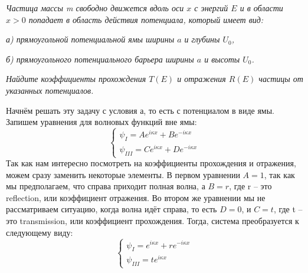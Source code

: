 \begin{center}
    \textit{Частица массы m свободно движется вдоль оси $x$ с энергий $E$ и в области $x>0$ попадает в область действия потенциала, который имеет вид:}
    
    \textit{а) прямоугольной потенциальной ямы ширины $a$ и глубины $U_0$,}

    \textit{б) прямоугольного потенциального барьера ширины $a$ и высоты $U_0$.}
    
    \textit{Найдите коэффициенты прохождения $T(E)$ и отражения $R(E)$ частицы от указанных потенциалов.}
\end{center}

Начнём решать эту задачу с условия а, то есть с потенциалом в виде ямы. Запишем уравнения для волновых функций вне ямы:
\[
\begin{cases}
\psi_I = Ae^{i\kappa x} + Be^{-i\kappa x} \\
\psi_{III} = Ce^{i\kappa x} + De^{-i\kappa x}
\end{cases}
\]
Так как нам интересно посмотреть на коэффициенты прохождения и отражения, можем сразу заменить некоторые элементы. В первом уравнении $A = 1$, так как мы предполагаем, что справа приходит полная волна, а $B = r$, где r -- это reflection, или коэффициент отражения. Во втором же уравнении мы не рассматриваем ситуацию, когда волна идёт справа, то есть $D = 0$, и $C = t$, где t -- это transmission, или коэффициент прохождения. Тогда, система преобразуется к следующему виду:
\[
\begin{cases}
\psi_I = e^{i\kappa x} + re^{-i\kappa x} \\
\psi_{III} = te^{i\kappa x}
\end{cases}
\]

